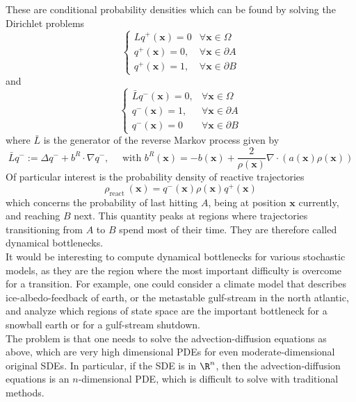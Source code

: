 \documentclass{article}
\begin{document}
These are conditional probability densities which can be found by solving the Dirichlet problems
$$
\left\{\begin{array}{cl}
L q^{+}(\boldsymbol{x})=0 & \forall \boldsymbol{x} \in \Omega \\
q^{+}(\boldsymbol{x})=0, & \forall \boldsymbol{x} \in \partial A \\
q^{+}(\boldsymbol{x})=1, & \forall \boldsymbol{x} \in \partial B
\end{array}\right.
$$
and
$$
\begin{cases}\bar{L} q^{-}(\boldsymbol{x})=0, & \forall \boldsymbol{x} \in \Omega \\ q^{-}(\boldsymbol{x})=1, & \forall \boldsymbol{x} \in \partial A \\ q^{-}(\boldsymbol{x})=0 & \forall \boldsymbol{x} \in \partial B\end{cases}
$$
where $\bar{L}$ is the generator of the reverse Markov process given by
$$
\bar{L} q^{-}:=\Delta q^{-}+b^{R} \cdot \nabla q^{-}, \quad \text { with } b^{R}(\boldsymbol{x})=-b(\boldsymbol{x})+\frac{2}{\rho(\boldsymbol{x})} \nabla \cdot(a(\boldsymbol{x}) \rho(\boldsymbol{x}))
$$
Of particular interest is the probability density of reactive trajectories
$$
\rho_{\text {react }}(\boldsymbol{x})=q^{-}(\boldsymbol{x}) \rho(\boldsymbol{x}) q^{+}(\boldsymbol{x})
$$
which concerns the probability of last hitting $A$, being at position $\boldsymbol{x}$ currently, and reaching $B$ next. 
This quantity peaks at regions where trajectories transitioning
from $A$ to $B$ spend most of their time. They are therefore called
dynamical bottlenecks. \\

It would be interesting to compute dynamical bottlenecks for various
stochastic models, as they are the region where the most important
difficulty is overcome for a transition. For example, one could consider
a climate model that describes ice-albedo-feedback of earth, or the
metastable gulf-stream in the north atlantic, and analyze which regions
of state space are the important bottleneck for a snowball earth or for
a gulf-stream shutdown. \\

The problem is that one needs to solve the advection-diffusion equations as above,
which are very high dimensional PDEs for even moderate-dimensional
original SDEs. In particular, if the SDE is in $\R^n$, then the advection-diffusion equations is an
$n$-dimensional PDE, which is difficult to solve with traditional methods. \\
\end{document}
